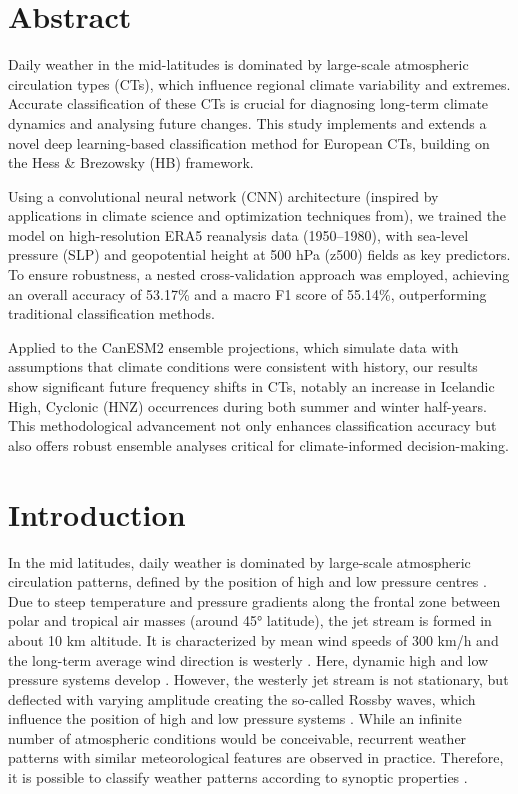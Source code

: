\documentclass[
]{krantz}
\begin{document}
\section{Abstract}\label{abstract}

Daily weather in the mid-latitudes is dominated by large-scale atmospheric circulation types (CTs), which influence regional climate variability and extremes.
Accurate classification of these CTs is crucial for diagnosing long-term climate dynamics and analysing future changes. This study implements and extends a novel deep learning-based classification method for European CTs, building on the Hess \& Brezowsky (HB) framework.

Using a convolutional neural network (CNN) architecture (inspired by applications in climate science and optimization techniques from), we trained the model on high-resolution ERA5 reanalysis data (1950--1980), with sea-level pressure (SLP) and geopotential height at 500 hPa (z500) fields as key predictors. To ensure robustness, a nested cross-validation approach was employed, achieving an overall accuracy of 53.17\% and a macro F1 score of 55.14\%, outperforming traditional classification methods.

Applied to the CanESM2 ensemble projections, which simulate data with assumptions that climate conditions were consistent with history, our results show significant future frequency shifts in CTs, notably an increase in Icelandic High, Cyclonic (HNZ) occurrences during both summer and winter half-years. This methodological advancement not only enhances classification accuracy but also offers robust ensemble analyses critical for climate-informed decision-making.

\section{Introduction}\label{introduction-1}

In the mid latitudes, daily weather is dominated by large-scale atmospheric circulation patterns,
defined by the position of high and low pressure centres \citep{Hackel2021, Mittermeier2022}.
Due to steep temperature and pressure gradients along the frontal zone between polar and tropical air masses (around 45° latitude),
the jet stream is formed in about 10 km altitude.
It is characterized by mean wind speeds of 300 km/h and the long-term average wind direction is westerly \citep{Hackel2021}.
Here, dynamic high and low pressure systems develop \citep{Hackel2021, Mittermeier2022}.
However, the westerly jet stream is not stationary, but deflected with varying amplitude creating the so-called Rossby waves,
which influence the position of high and low pressure systems \citep{Hackel2021}.
While an infinite number of atmospheric conditions would be conceivable, recurrent weather patterns with similar meteorological features are observed in practice.
Therefore, it is possible to classify weather patterns according to synoptic properties \citep{Bissolli2001b}.
\end{document}
